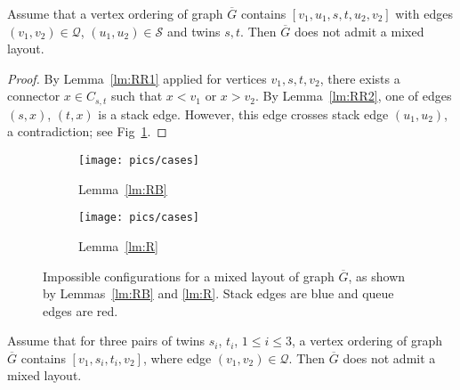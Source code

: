 \documentclass[orivec]{llncs}
\newcommand{\Sh}{{\ensuremath{\mathcal{S}}}}
\newcommand{\Qh}{{\ensuremath{\mathcal{Q}}}}
\newcommand{\Gc}{{\ensuremath{\overline{G}}}}
\begin{document}
\begin{lemma}
\label{lm:RB}
Assume that a vertex ordering of graph $\Gc$ contains $[v_1, u_1, s, t, u_2, v_2]$ with edges $(v_1, v_2) \in \Qh$, $(u_1, u_2) \in \Sh$
and twins $s, t$. Then $\Gc$ does not admit a mixed layout.
\end{lemma}

\begin{proof}
    By Lemma~\ref{lm:RR1} applied for vertices $v_1, s, t, v_2$, there exists a connector $x \in C_{s,t}$
    such that $x < v_1$ or $x > v_2$. By Lemma~\ref{lm:RR2},
    one of edges $(s, x)$, $(t, x)$ is a stack edge. However, this edge crosses
    stack edge $(u_1, u_2)$, a contradiction; see Fig~\ref{fig:lemmaRB}.
\end{proof}

\begin{figure}[t]
    \centering
    \begin{subfigure}[b]{.4\linewidth}
        \texttt{[image: pics/cases]}
        \caption{Lemma~\ref{lm:RB}}
        \label{fig:lemmaRB}
    \end{subfigure}
    \hfill
    \begin{subfigure}[b]{.4\linewidth}
        \texttt{[image: pics/cases]}
        \caption{Lemma~\ref{lm:R}}
        \label{fig:lemmaR}
    \end{subfigure}
    \caption{Impossible configurations for a mixed layout of graph $\Gc$, as
        shown by Lemmas~\ref{lm:RB} and \ref{lm:R}. Stack edges are blue and queue edges are red.}
    \label{fig:lemmas}
\end{figure}

\begin{lemma}
    \label{lm:R}
    Assume that for three pairs of twins $s_i$, $t_i$, $1 \le i \le 3$, a vertex ordering of graph $\Gc$
    contains $[v_1, s_i, t_i, v_2]$, where edge $(v_1, v_2) \in \Qh$. Then $\Gc$ does not admit a mixed layout.
\end{lemma}
\end{document}
